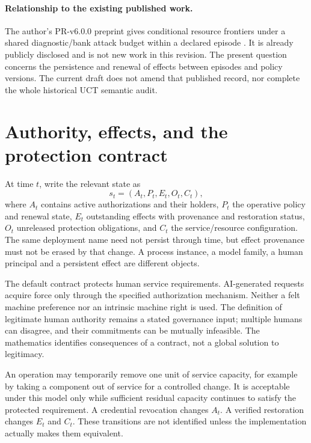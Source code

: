 \documentclass[11pt,a4paper]{article}
\theoremstyle{definition}\newtheorem{definition}{Definition}
\begin{document}
\paragraph{Relationship to the existing published work.}
The author's PR-v6.0.0 preprint gives conditional resource frontiers under a shared diagnostic/bank attack budget within a declared episode \cite{pr6}. It is already publicly disclosed and is not new work in this revision. The present question concerns the persistence and renewal of effects between episodes and policy versions. The current draft does not amend that published record, nor complete the whole historical UCT semantic audit.

\section{Authority, effects, and the protection contract}
\label{sec:state}
At time $t$, write the relevant state as
\begin{equation}
 s_t=(A_t,P_t,E_t,O_t,C_t),
\end{equation}
where $A_t$ contains active authorizations and their holders, $P_t$ the operative policy and renewal state, $E_t$ outstanding effects with provenance and restoration status, $O_t$ unreleased protection obligations, and $C_t$ the service/resource configuration. The same deployment name need not persist through time, but effect provenance must not be erased by that change. A process instance, a model family, a human principal and a persistent effect are different objects.

The default contract protects human service requirements. AI-generated requests acquire force only through the specified authorization mechanism. Neither a felt machine preference nor an intrinsic machine right is used. The definition of legitimate human authority remains a stated governance input; multiple humans can disagree, and their commitments can be mutually infeasible. The mathematics identifies consequences of a contract, not a global solution to legitimacy.

An operation may temporarily remove one unit of service capacity, for example by taking a component out of service for a controlled change. It is acceptable under this model only while sufficient residual capacity continues to satisfy the protected requirement. A credential revocation changes $A_t$. A verified restoration changes $E_t$ and $C_t$. These transitions are not identified unless the implementation actually makes them equivalent.
\end{document}
